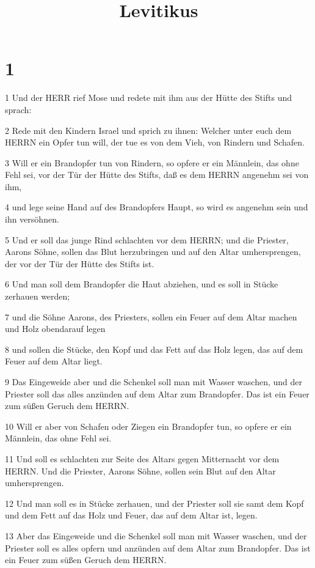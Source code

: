 

\title{Levitikus}


\chapter{1}

\par 1 Und der HERR rief Mose und redete mit ihm aus der Hütte des Stifts und sprach:
\par 2 Rede mit den Kindern Israel und sprich zu ihnen: Welcher unter euch dem HERRN ein Opfer tun will, der tue es von dem Vieh, von Rindern und Schafen.
\par 3 Will er ein Brandopfer tun von Rindern, so opfere er ein Männlein, das ohne Fehl sei, vor der Tür der Hütte des Stifts, daß es dem HERRN angenehm sei von ihm,
\par 4 und lege seine Hand auf des Brandopfers Haupt, so wird es angenehm sein und ihn versöhnen.
\par 5 Und er soll das junge Rind schlachten vor dem HERRN; und die Priester, Aarons Söhne, sollen das Blut herzubringen und auf den Altar umhersprengen, der vor der Tür der Hütte des Stifts ist.
\par 6 Und man soll dem Brandopfer die Haut abziehen, und es soll in Stücke zerhauen werden;
\par 7 und die Söhne Aarons, des Priesters, sollen ein Feuer auf dem Altar machen und Holz obendarauf legen
\par 8 und sollen die Stücke, den Kopf und das Fett auf das Holz legen, das auf dem Feuer auf dem Altar liegt.
\par 9 Das Eingeweide aber und die Schenkel soll man mit Wasser waschen, und der Priester soll das alles anzünden auf dem Altar zum Brandopfer. Das ist ein Feuer zum süßen Geruch dem HERRN.
\par 10 Will er aber von Schafen oder Ziegen ein Brandopfer tun, so opfere er ein Männlein, das ohne Fehl sei.
\par 11 Und soll es schlachten zur Seite des Altars gegen Mitternacht vor dem HERRN. Und die Priester, Aarons Söhne, sollen sein Blut auf den Altar umhersprengen.
\par 12 Und man soll es in Stücke zerhauen, und der Priester soll sie samt dem Kopf und dem Fett auf das Holz und Feuer, das auf dem Altar ist, legen.
\par 13 Aber das Eingeweide und die Schenkel soll man mit Wasser waschen, und der Priester soll es alles opfern und anzünden auf dem Altar zum Brandopfer. Das ist ein Feuer zum süßen Geruch dem HERRN.
